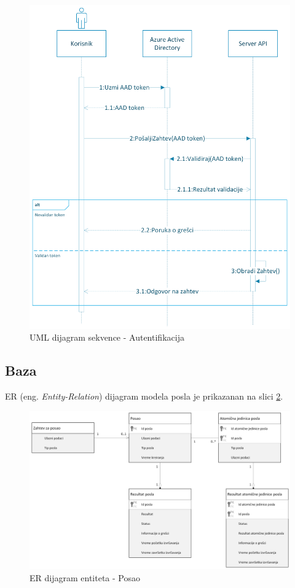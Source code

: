 \documentclass[12pt,oneside]{memoir}
\begin{document}
\begin{figure}[!ht]
  \centering
  \includegraphics[width=1.0\textwidth]{./images/autentikacija_uml_dijagram_sekvence.png}
  \caption{UML dijagram sekvence - Autentifikacija}
  \label{fig:autentifikacija}
\end{figure}


\subsection{Baza}

ER (eng. \emph{Entity-Relation}) dijagram modela posla je prikazanan na slici \ref{fig:erposao}.

\begin{figure}[!ht]
  \centering
  \includegraphics[width=1.0\textwidth]{./images/uml_er_dijagram_posao.png}
  \caption{ER dijagram entiteta - Posao}
  \label{fig:erposao}
\end{figure}
\end{document}
